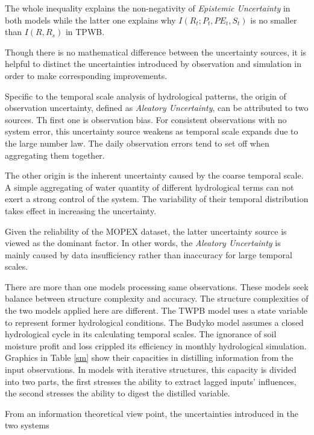 \documentclass[draft,wrr]{AGUTeX}
\begin{document}
\begin{article}
The whole inequality explains the non-negativity of \emph{Epistemic Uncertainty} in both models while the latter one explains why $I(R_t;P_t,PE_t,S_t)$ is no smaller than $I(R,R_s)$ in TPWB.

Though there is no mathematical difference between the uncertainty sources, it is helpful to distinct the uncertainties introduced by observation and simulation in order to make corresponding improvements\citep{gong2013estimating}. 

Specific to the temporal scale analysis of hydrological patterns, the origin of observation uncertainty, defined as \emph{Aleatory Uncertainty}, can be attributed to two sources. Th first one is  observation bias. For consistent observations with no system error, this uncertainty source  weakens as temporal scale expands  due to the large number law. The daily observation errors tend to set off when aggregating them together. 

The other origin is the inherent uncertainty caused by the coarse temporal scale. A simple aggregating of water quantity of different hydrological terms can not exert a strong control of the system. The variability of their temporal distribution takes effect in increasing the uncertainty. 

Given the reliability of the MOPEX dataset, the latter uncertainty source is viewed as the dominant factor. In other words, the \emph{Aleatory Uncertainty} is mainly caused by data insufficiency rather than inaccuracy for large temporal scales.

There are more than one models processing same observations. These models seek balance between structure complexity and accuracy. The structure complexities of the two models applied here are different. The TWPB model uses a state variable to represent former hydrological conditions. The Budyko model assumes a closed hydrological cycle in its calculating temporal scales. The ignorance of soil moisture profit and loss crippled its efficiency in monthly hydrological simulation. Graphics in Table \ref{sm} show their capacities in distilling information from the input observations. In models with iterative structures, this capacity is divided into two parts, the first stresses the ability to extract lagged inputs' influences, the second stresses the ability to digest the distilled variable. 






\iffalse
From an information theoretical view point, the uncertainties introduced in the two systems   

\end{article}
\end{document}
